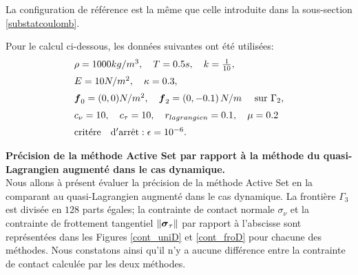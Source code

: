 La configuration de référence est la même que celle introduite dans la sous-section \ref{substatcoulomb}.

Pour le calcul ci-dessous, les données suivantes ont été utilisées:
\begin{eqnarray*}
	\begin{array}{l}
		\rho = 1000kg/m^3, \quad T=0.5s,  \quad k=\frac{1}{10}, \nonumber \\[2mm]
		E= 10N/m^2,\quad \kappa=0.3,\nonumber \\[2mm]
		\mbox{\boldmath{$f$}}_0=(0,0) N/m^2, \quad \mbox{\boldmath{$f$}}_2= (0,-0.1)\, N/m    \quad \mbox{ sur }
		\Gamma_2, \nonumber\\[2mm]
		c_\nu=10, \quad c_\tau=10,\quad r_{lagrangien}=0.1\nonumber, \quad \mu = 0.2\\[2mm]
		{\rm crit\acute{e}re \quad d'arr\hat{e}t}: \epsilon=10^{-6}.
	\end{array}
\end{eqnarray*}

\noindent\textbf{Précision de la méthode Active Set par rapport à la méthode du quasi-Lagrangien augmenté dans le cas dynamique.}\\
Nous allons à présent évaluer la précision de la méthode Active Set en la comparant au quasi-Lagrangien augmenté dans le cas dynamique. La frontière  $\Gamma_3$ est divisée en $128$ parts égales; la contrainte de contact normale $\sigma_{\nu}$ et la contrainte de frottement tangentiel $\|\mbox{\boldmath{$\sigma$}}_{\tau}\|$ par rapport à l'abscisse sont représentées dans les Figures \ref{cont_uniD} et \ref{cont_froD} pour chacune des méthodes. Nous constatons ainsi qu'il n'y a aucune différence entre la contrainte de contact calculée par les deux méthodes.\\


